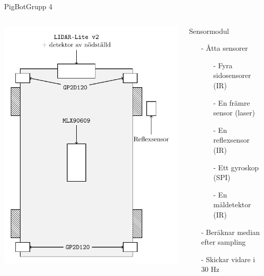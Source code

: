 \begin{frame}{PigBot}{Grupp 4} 
  \begin{columns}
    \begin{column}{0.5\textwidth}
      \centering
      \includegraphics[scale=0.6]{images/sensor.pdf}
    \end{column}
    \begin{column}{0.5\textwidth}

      Sensormodul
      \begin{itemize}
	\item[-] Åtta sensorer
	  \begin{itemize}
	    \item[-] Fyra sidosensorer (IR)
	    \item[-] En främre sensor (laser)
	    \item[-] En reflexsensor (IR)
	    \item[-] Ett gyroskop (SPI)
	    \item[-] En måldetektor (IR)
	  \end{itemize}
	  \pause
	\item[-] Beräknar median efter sampling
	  \pause
	\item[-] Skickar vidare i $30$ Hz
      \end{itemize}
    \end{column}

  \end{columns}
\end{frame}

